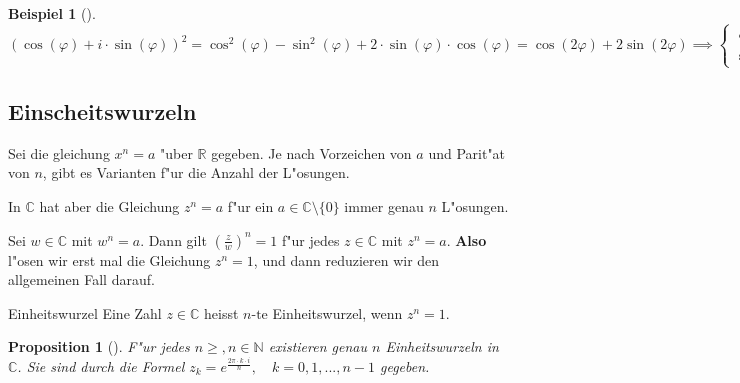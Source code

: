 \documentclass[11pt]{article}
\newtheorem{exa}{Beispiel}[section]
\newtheorem*{proposition}{Proposition}
\begin{document}
\begin{exa}[] \label{}\
\begin{equation*}
(\cos(\varphi)+i\cdot \sin(\varphi))^2 =\cos^2(\varphi)-\sin^2(\varphi)+2\cdot\sin(\varphi)\cdot\cos(\varphi) 
 = \cos(2\varphi) + 2\sin(2\varphi) 
 \implies 
\begin{cases}
\cos(2\varphi)=\cos^2(\varphi)-\sin^2(\varphi) \\
\sin(2\varphi)=2\cdot\sin(\varphi)\cdot\cos(\varphi)
\end{cases}
\end{equation*}
\end{exa}

\subsection{Einscheitswurzeln}
\label{sec:org0755105}
Sei die gleichung \(x^n=a\) "uber \(\mathbb{R}\) gegeben. Je nach Vorzeichen von
\(a\) und Parit"at von \(n\), gibt es Varianten f"ur die Anzahl der L"osungen.
\begin{relation}
In \(\mathbb{C}\) hat aber die Gleichung \(z^n=a\) f"ur ein \(a\in
\mathbb{C}\setminus \{0\}\) immer genau \(n\) L"osungen.
\end{relation}

Sei \(w\in \mathbb{C}\) mit \(w^n=a\). Dann gilt \((\frac{z}{w})^n=1\) f"ur jedes
\(z\in \mathbb{C}\) mit \(z^n=a\). \textbf{Also} l"osen wir erst mal die Gleichung \(z^n=1\),
und dann reduzieren wir den allgemeinen Fall darauf.

\begin{definition}{Einheitswurzel}{}
Eine Zahl \(z\in \mathbb{C}\) heisst \(n\text{-te}\) Einheitswurzel, wenn \(z^n=1\).
\end{definition}

\begin{proposition}[] \label{}
F"ur jedes \(n\geq, n\in\mathbb{N}\) existieren genau \(n\)
Einheitswurzeln in \(\mathbb{C}\). Sie sind durch die Formel
\(z_k=e^{\frac{2\pi\cdot k\cdot i}{n}},\quad k=0,1,...,n-1\) gegeben.
\end{proposition}
\end{document}
